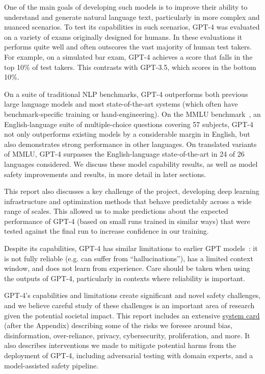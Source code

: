 \documentclass{article}
\begin{document}
One of the main goals of developing such models is to improve their ability to understand and generate natural language text, particularly in more complex and nuanced scenarios.
 To test its capabilities in such scenarios, GPT-4 was evaluated on a variety of exams originally designed for humans. In these evaluations it performs quite well and often outscores the vast majority of human test takers. For example, on a simulated bar exam, GPT-4 achieves a score that falls in the top 10\% of test takers. This contrasts with GPT-3.5, which scores in the bottom 10\%. 
 
 On a suite of traditional NLP benchmarks, GPT-4 outperforms both previous large language models and most state-of-the-art systems (which often have benchmark-specific training or hand-engineering). On the MMLU benchmark~\citep{hendryckstest2021,hendrycks2021ethics}, an English-language suite of multiple-choice questions covering 57 subjects, GPT-4 not only outperforms existing models by a considerable margin in English, but also demonstrates strong performance in other languages. On translated variants of MMLU, GPT-4 surpasses the English-language state-of-the-art in 24 of 26 languages considered. We discuss these model capability results, as well as model safety improvements and results, in more detail in later sections. 


This report also discusses a key challenge of the project, developing deep learning infrastructure and optimization methods that behave predictably across a wide range of scales. This allowed us to make predictions about the expected performance of GPT-4 (based on small runs trained in similar ways) that were tested against the final run to increase confidence in our training. 

Despite its capabilities, GPT-4 has similar limitations to earlier GPT models~\citep{brown2020language,radford2019language,radford2018improving}: it is not fully reliable (e.g. can suffer from ``hallucinations''), has a limited context window, and does not learn from experience. Care should be taken when using the outputs of GPT-4, particularly in contexts where reliability is important. 

GPT-4's capabilities and limitations create significant and novel safety challenges, and we believe careful study of these challenges is an important area of research given the potential societal impact. This report includes an extensive \hyperref[systemcard]{system card} (after the Appendix) describing some of the risks we foresee around bias, disinformation, over-reliance, privacy, cybersecurity, proliferation, and more. It also describes interventions we made to mitigate potential harms from the deployment of GPT-4, including adversarial testing with domain experts, and a model-assisted safety pipeline.
\end{document}
